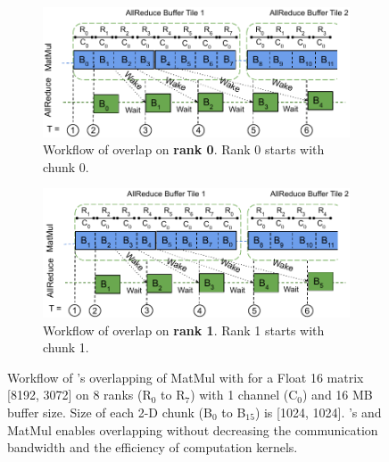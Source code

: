 \begin{figure}[t]
	\centering
    \begin{subfigure}{0.48\linewidth}
    	\centering
    \includegraphics[width=\linewidth]{figures/overlap-example-rank-0.pdf}
    \caption{Workflow of overlap on \textbf{rank 0}. Rank 0 starts with chunk 0. }
	\end{subfigure}
    \hfill %
    \begin{subfigure}{0.48\linewidth}
    	\centering
        \includegraphics[width=\linewidth]{figures/overlap-example-rank-1.pdf}
        \caption{Workflow of overlap on \textbf{rank 1}. Rank 1 starts with chunk 1. }
    \end{subfigure}

	\caption{Workflow of \tool's overlapping of MatMul with \allreduce for a Float 16 matrix [8192, 3072] on 8 ranks (R$_0$ to R$_7$) with 1 channel (C$_0$) and 16 MB buffer size. Size of each 2-D chunk (B$_0$ to B$_{15}$) is [1024, 1024]. \tool's \allreduce and MatMul enables overlapping without decreasing the communication bandwidth and the efficiency of computation kernels.\label{fig:workflow-overlap}}
\end{figure}

